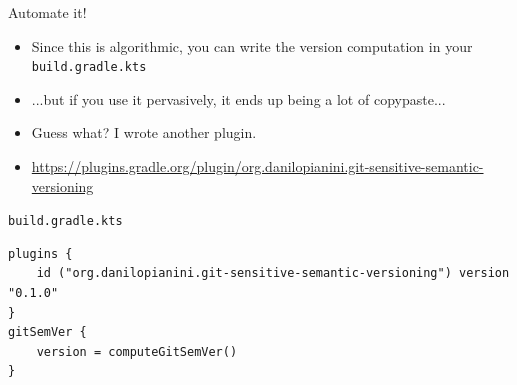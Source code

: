 \documentclass[presentation]{beamer}
\begin{document}
\begin{frame}[fragile]{Automate it!}
    \begin{itemize}
        \item Since this is algorithmic, you can write the version computation in your \texttt{build.gradle.kts}
        \item ...but if you use it pervasively, it ends up being a lot of copypaste...
        \item Guess what? I wrote another plugin.
        \item \url{https://plugins.gradle.org/plugin/org.danilopianini.git-sensitive-semantic-versioning}
    \end{itemize}
    \begin{block}{\texttt{build.gradle.kts}}
		\begin{verbatim}
plugins {
    id ("org.danilopianini.git-sensitive-semantic-versioning") version "0.1.0"
}
gitSemVer {
    version = computeGitSemVer()
}
		\end{verbatim}
	\end{block}
\end{frame}

\section*{\refname}
\begin{frame}[allowframebreaks]
  \frametitle{\refname}
  \scriptsize
  
  
\end{frame}
\section*{\refname}
\end{document}
